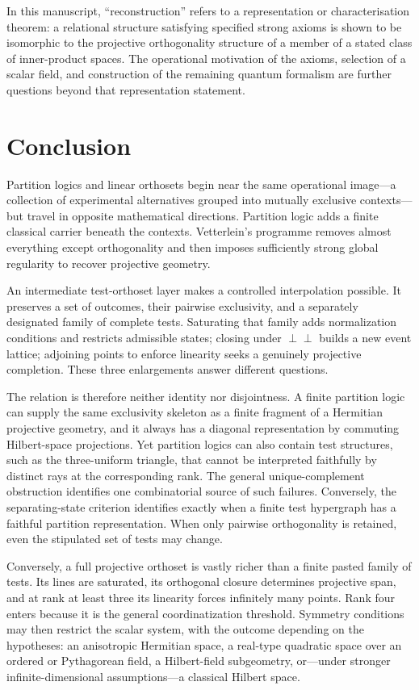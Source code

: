 \documentclass[
  aps,
  pra,
  twocolumn,
  amsmath,
  amssymb,
  longbibliography,
  nofootinbib,
  floatfix
]{revtex4-2}
\begin{document}
In this manuscript, ``reconstruction'' refers to a representation or
characterisation theorem: a relational structure satisfying specified strong
axioms is shown to be isomorphic to the projective orthogonality structure of a
member of a stated class of inner-product spaces.  The operational motivation
of the axioms, selection of a scalar field, and construction of the remaining
quantum formalism are further questions beyond that representation statement.

\section{Conclusion}
\label{sec:conclusion}

Partition logics and linear orthosets begin near the same operational image---a
collection of experimental alternatives grouped into mutually exclusive
contexts---but travel in opposite mathematical directions.  Partition logic
adds a finite classical carrier beneath the contexts.  Vetterlein's programme
removes almost everything except orthogonality and then imposes sufficiently
strong global regularity to recover projective geometry.

An intermediate test-orthoset layer makes a controlled interpolation possible.
It preserves a set of outcomes, their pairwise exclusivity, and a separately
designated family of complete tests.  Saturating that family adds normalization
conditions and restricts admissible states; closing under $\perp\perp$ builds a
new event lattice; adjoining points to enforce linearity seeks a genuinely
projective completion.  These three enlargements answer different questions.

The relation is therefore neither identity nor disjointness.  A finite
partition logic can supply the same exclusivity skeleton as a finite fragment
of a Hermitian projective geometry, and it always has a diagonal representation
by commuting Hilbert-space projections.  Yet partition logics can also contain
test structures, such as the three-uniform triangle, that cannot be interpreted
faithfully by distinct rays at the corresponding rank.  The general
unique-complement obstruction identifies one combinatorial source of such
failures.  Conversely, the separating-state criterion identifies exactly when
a finite test hypergraph has a faithful partition representation.  When only
pairwise orthogonality is retained, even the stipulated set of tests may change.

Conversely, a full projective orthoset is vastly richer than a finite pasted
family of tests.  Its lines are saturated, its orthogonal closure determines
projective span, and at rank at least three its linearity forces infinitely many
points.  Rank four enters because it is the general coordinatization threshold.
Symmetry conditions may then restrict the scalar system, with the outcome
depending on the hypotheses: an anisotropic Hermitian space, a real-type
quadratic space over an ordered or Pythagorean field, a Hilbert-field
subgeometry, or---under
stronger infinite-dimensional assumptions---a classical Hilbert space.
\end{document}
